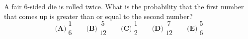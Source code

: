 A fair $6$-sided die is rolled twice. What is the probability that the first number that comes up is greater than or equal to the second number?
\[
\textbf{(A)}\ \dfrac{1}{6}\qquad\textbf{(B)}\ \dfrac{5}{12}\qquad\textbf{(C)}\ \dfrac{1}{2}\qquad\textbf{(D)}\ \dfrac{7}{12}\qquad\textbf{(E)}\ \dfrac{5}{6}
\]

